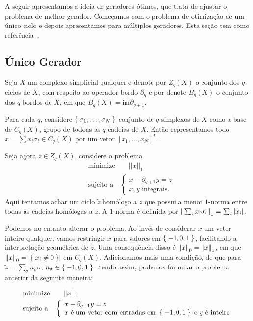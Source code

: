 A seguir apresentamos a ideia de geradores ótimos, que trata de ajustar
o problema de melhor gerador. Começamos com o problema de otimização
de um único ciclo e depois apresentamos para múltiplos geradores. 
Esta seção tem como referência~\cite{Escolar2015}. 

\subsection{Único Gerador}
Seja $X$ um complexo simplicial qualquer e denote por $Z_q(X)$ o 
conjunto dos $q$-ciclos de $X$, com respeito ao operador bordo $\partial_q$ e 
por denote $B_q(X)$ o conjunto dos $q$-bordos de $X$, em que 
$B_q(X) = \text{im} \partial_{q+1}$.

Para cada $q$, considere $\Set{\sigma_1, \dots, \sigma_N}$ conjunto de $q$-simplexos
de $X$ como a base de $C_q(X)$, grupo de todoas as $q$-cadeias de $X$. Então
representamos todo $x = \sum x_i\sigma_i \in C_q(X)$ por um vetor 
$[x_1, \dots, x_N]^T$. 

Seja agora $z \in Z_q(X)$, considere o problema 
\begin{equation}\label{eq:probfour}
    \begin{split}
        &\text{minimize} \quad \quad ||x||_1 \\
        &\text{sujeito a} \quad \left \{ \begin{array}{l}
            x - \partial_{q+1} y = z \\
            x,y \text{ integrais.}
        \end{array} \right.
    \end{split}
\end{equation}
Aqui tentamos achar um ciclo $\tilde{z}$ homólogo a $z$ que possui 
a menor $1$-norma entre todas as cadeias homólogas a $z$. A $1$-norma é definida
por $\left\lVert\sum_i x_i\sigma_i\right\rVert_1 = \sum_i\left\lvert x_i\right\rvert$. 

Podemos no entanto alterar o problema. Ao invés de considerar $x$ um vetor inteiro
qualquer, vamos restringir $x$ para valores em $\Set{-1,0,1}$, facilitando a interpretação
geométrica de $\tilde{z}$. Uma consequência disso é $\left\lVert x\right\rVert_0 = \left\lVert x\right\rVert_1$, em que
$\left\lVert x\right\rVert_0 = \left\lvert\Set{x_i \neq 0}\right\rvert$ em $C_q(X)$. Adicionamos mais uma condição,
de que para $\tilde{z} = \sum_\sigma n_\sigma \sigma$, $n_\sigma \in \Set{-1,0,1}$. 
Sendo assim, podemos formular o problema anterior da seguinte maneira:

\begin{equation}\label{eq:probfive}
    \begin{split}
        &\text{minimize} \quad \quad ||x||_1 \\
        &\text{sujeito a} \quad \left \{ \begin{array}{l}
            x - \partial_{q+1} y = z \\
            x \text{ é um vetor com entradas em } \Set{-1,0,1} \text{ e } 
            y \text{ é inteiro}
        \end{array} \right.
    \end{split}
\end{equation}

